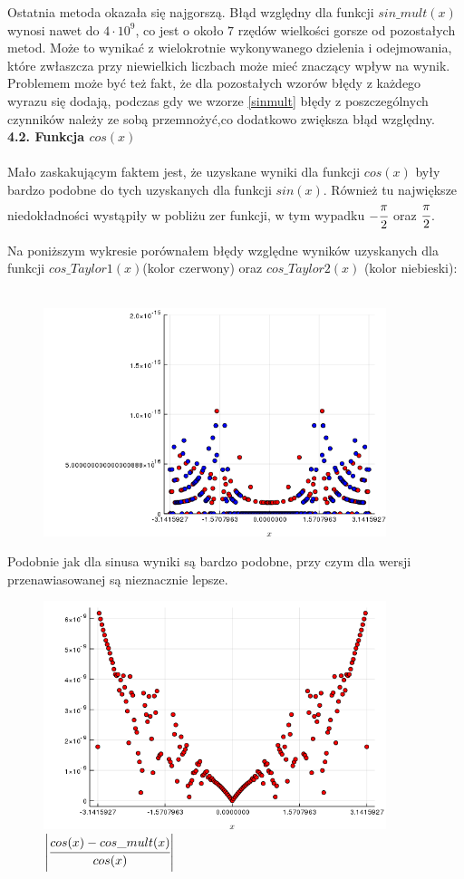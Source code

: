 \documentclass[a4paper]{article}
\begin{document}
Ostatnia metoda okazała się najgorszą. Błąd względny dla funkcji $sin\_mult(x)$ wynosi nawet do $4 \cdot 10^9$, co jest o około $7$ rzędów wielkości gorsze od pozostałych metod. Może to wynikać z wielokrotnie wykonywanego dzielenia i odejmowania, które zwłaszcza przy niewielkich liczbach może mieć znaczący wpływ na wynik. Problemem może być też fakt, że dla pozostałych wzorów błędy z każdego wyrazu się dodają, podczas gdy we wzorze \eqref{sinmult} błędy z poszczególnych czynników należy ze sobą przemnożyć,co dodatkowo zwiększa błąd względny.\\

\large
\textbf{4.2. Funkcja $cos(x)$}\\\\
\normalsize
Mało zaskakującym faktem jest, że uzyskane wyniki dla funkcji $cos(x)$ były bardzo podobne do tych uzyskanych dla funkcji $sin(x)$. Również tu największe niedokładności wystąpiły w pobliżu zer funkcji, w tym wypadku $-\cfrac{\pi}{2}$ oraz $\cfrac{\pi}{2}$. 

Na poniższym wykresie porównałem błędy względne wyników uzyskanych dla funkcji $cos\_Taylor1(x)$(kolor czerwony) oraz $cos\_Taylor2(x)$ (kolor niebieski):\\\\

\begin{figure}[h!]
  \includegraphics[width=10cm]{cosinus.png}
\end{figure}

Podobnie jak dla sinusa wyniki są bardzo podobne, przy czym dla wersji przenawiasowanej są nieznacznie lepsze. 
\begin{figure}[h!]
  \includegraphics[width=10cm]{cos_mult.png}
  \caption{$\left| \cfrac{cos(x) - cos\_mult(x)}{cos(x)} \right| $}
\end{figure}
\end{document}
